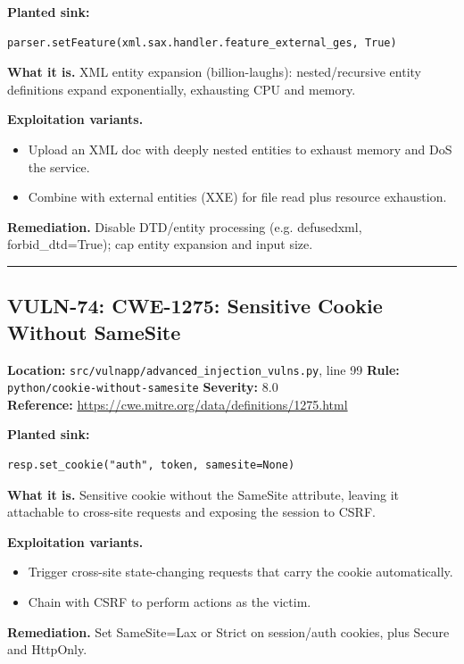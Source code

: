 \documentclass[11pt,a4paper]{article}
\begin{document}
\noindent\textbf{Planted sink:}
\begin{lstlisting}
parser.setFeature(xml.sax.handler.feature_external_ges, True)
\end{lstlisting}
\noindent\textbf{What it is.} XML entity expansion (billion-laughs): nested/recursive entity definitions expand exponentially, exhausting CPU and memory.

\noindent\textbf{Exploitation variants.}
\begin{itemize}[leftmargin=1.4em,itemsep=1pt,topsep=2pt]
\item Upload an XML doc with deeply nested entities to exhaust memory and DoS the service.
\item Combine with external entities (XXE) for file read plus resource exhaustion.
\end{itemize}
\noindent\textbf{Remediation.} Disable DTD/entity processing (e.g. defusedxml, forbid\_dtd=True); cap entity expansion and input size.

\vspace{4pt}\hrule\vspace{6pt}
\subsection{VULN-74: CWE-1275: Sensitive Cookie Without SameSite}
\noindent\textbf{Location:} \texttt{src/vulnapp/advanced\_injection\_vulns.py}, line 99 \quad \textbf{Rule:} \texttt{python/cookie-without-samesite} \quad \textbf{Severity:} 8.0
\\ \textbf{Reference:} \url{https://cwe.mitre.org/data/definitions/1275.html}

\noindent\textbf{Planted sink:}
\begin{lstlisting}
resp.set_cookie("auth", token, samesite=None)
\end{lstlisting}
\noindent\textbf{What it is.} Sensitive cookie without the SameSite attribute, leaving it attachable to cross-site requests and exposing the session to CSRF.

\noindent\textbf{Exploitation variants.}
\begin{itemize}[leftmargin=1.4em,itemsep=1pt,topsep=2pt]
\item Trigger cross-site state-changing requests that carry the cookie automatically.
\item Chain with CSRF to perform actions as the victim.
\end{itemize}
\noindent\textbf{Remediation.} Set SameSite=Lax or Strict on session/auth cookies, plus Secure and HttpOnly.
\end{document}
